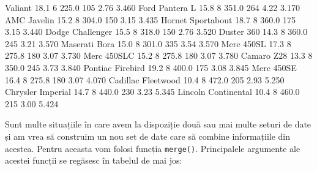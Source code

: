 \documentclass[]{article}
\newenvironment{Shaded}{\begin{snugshade}}{\end{snugshade}}
\newcommand{\DecValTok}[1]{\textcolor[rgb]{0.00,0.00,0.81}{#1}}
\newcommand{\FloatTok}[1]{\textcolor[rgb]{0.00,0.00,0.81}{#1}}
\newcommand{\NormalTok}[1]{#1}
\begin{document}
\begin{Shaded}
\begin{Highlighting}[]
\NormalTok{Valiant             }\FloatTok{18.1}   \DecValTok{6} \FloatTok{225.0} \DecValTok{105} \FloatTok{2.76} \FloatTok{3.460}
\NormalTok{Ford Pantera L      }\FloatTok{15.8}   \DecValTok{8} \FloatTok{351.0} \DecValTok{264} \FloatTok{4.22} \FloatTok{3.170}
\NormalTok{AMC Javelin         }\FloatTok{15.2}   \DecValTok{8} \FloatTok{304.0} \DecValTok{150} \FloatTok{3.15} \FloatTok{3.435}
\NormalTok{Hornet Sportabout   }\FloatTok{18.7}   \DecValTok{8} \FloatTok{360.0} \DecValTok{175} \FloatTok{3.15} \FloatTok{3.440}
\NormalTok{Dodge Challenger    }\FloatTok{15.5}   \DecValTok{8} \FloatTok{318.0} \DecValTok{150} \FloatTok{2.76} \FloatTok{3.520}
\NormalTok{Duster }\DecValTok{360}          \FloatTok{14.3}   \DecValTok{8} \FloatTok{360.0} \DecValTok{245} \FloatTok{3.21} \FloatTok{3.570}
\NormalTok{Maserati Bora       }\FloatTok{15.0}   \DecValTok{8} \FloatTok{301.0} \DecValTok{335} \FloatTok{3.54} \FloatTok{3.570}
\NormalTok{Merc 450SL          }\FloatTok{17.3}   \DecValTok{8} \FloatTok{275.8} \DecValTok{180} \FloatTok{3.07} \FloatTok{3.730}
\NormalTok{Merc 450SLC         }\FloatTok{15.2}   \DecValTok{8} \FloatTok{275.8} \DecValTok{180} \FloatTok{3.07} \FloatTok{3.780}
\NormalTok{Camaro Z28          }\FloatTok{13.3}   \DecValTok{8} \FloatTok{350.0} \DecValTok{245} \FloatTok{3.73} \FloatTok{3.840}
\NormalTok{Pontiac Firebird    }\FloatTok{19.2}   \DecValTok{8} \FloatTok{400.0} \DecValTok{175} \FloatTok{3.08} \FloatTok{3.845}
\NormalTok{Merc 450SE          }\FloatTok{16.4}   \DecValTok{8} \FloatTok{275.8} \DecValTok{180} \FloatTok{3.07} \FloatTok{4.070}
\NormalTok{Cadillac Fleetwood  }\FloatTok{10.4}   \DecValTok{8} \FloatTok{472.0} \DecValTok{205} \FloatTok{2.93} \FloatTok{5.250}
\NormalTok{Chrysler Imperial   }\FloatTok{14.7}   \DecValTok{8} \FloatTok{440.0} \DecValTok{230} \FloatTok{3.23} \FloatTok{5.345}
\NormalTok{Lincoln Continental }\FloatTok{10.4}   \DecValTok{8} \FloatTok{460.0} \DecValTok{215} \FloatTok{3.00} \FloatTok{5.424}
\end{Highlighting}
\end{Shaded}

Sunt multe situațiile în care avem la dispoziție două sau mai multe
seturi de date și am vrea să construim un nou set de date care să
combine informațiile din acestea. Pentru aceasta vom folosi funcția
\texttt{merge()}. Principalele argumente ale acestei funcții se regăsesc
în tabelul de mai jos:
\end{document}
